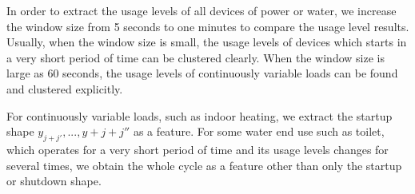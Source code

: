 In order to extract the usage levels of all devices of power or water, 
we increase the window size from 5 seconds to one minutes 
to compare the usage level results. 
Usually, when the window size is small, 
the usage levels of devices which starts in a very short period of time 
can be clustered clearly. 
When the window size is large as $60$ seconds, 
the usage levels of continuously variable loads can be 
found and clustered explicitly. 

For continuously variable loads, such as indoor heating, 
we extract the startup shape $y_{j+j'}, ..., y+{j+j''}$ as a feature. 
For some water end use such as toilet, which operates for a very short period of time 
and its usage levels changes for several times, 
we obtain the whole cycle as a feature other than only the startup or shutdown shape.
